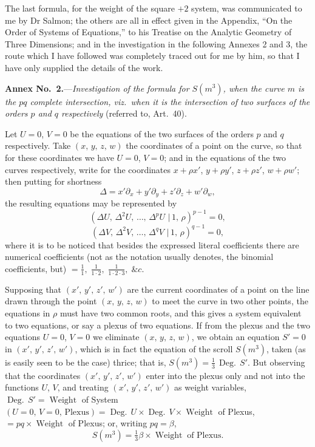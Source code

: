 \documentclass[11pt,a4paper]{article}
\providecommand{\mid}{\,|\,}
\providecommand{\Weight}{\operatorname{Weight}}
\providecommand{\Deg}{\operatorname{Deg.}}
\begin{document}
The last formula, for the weight of the square $+2$ system, was communicated to me by Dr Salmon; the others are all in effect given in the Appendix, ``On the Order of Systems of Equations,'' to his Treatise on the Analytic Geometry of Three Dimensions; and in the investigation in the following Annexes 2 and 3, the route which I have followed was completely traced out for me by him, so that I have only supplied the details of the work.

\bigskip

\begin{center}
\textbf{Annex No.~2.}---\textit{Investigation of the formula for $S(m^3)$, when the curve $m$ is the $pq$ complete intersection, viz.\ when it is the intersection of two surfaces of the orders $p$ and $q$ respectively} (referred to, Art.~40).
\end{center}

Let $U = 0$, $V = 0$ be the equations of the two surfaces of the orders $p$ and $q$ respectively. Take $(x,\,y,\,z,\,w)$ the coordinates of a point on the curve, so that for these coordinates we have $U = 0$, $V = 0$; and in the equations of the two curves respectively, write for the coordinates $x + \rho x'$, $y + \rho y'$, $z + \rho z'$, $w + \rho w'$; then putting for shortness
\[
\Delta = x' \partial_x + y' \partial_y + z' \partial_z + w' \partial_w,
\]
the resulting equations may be represented by
\[
(\Delta U,\,\Delta^2 U,\,\ldots,\,\Delta^p U\,\mid 1,\,\rho)^{p-1} = 0,
\]
\[
(\Delta V,\,\Delta^2 V,\,\ldots,\,\Delta^q V\,\mid 1,\,\rho)^{q-1} = 0,
\]
where it is to be noticed that besides the expressed literal coefficients there are numerical coefficients (not as the notation usually denotes, the binomial coefficients, but) $= \tfrac{1}{1},\;\tfrac{1}{1 \cdot 2},\;\tfrac{1}{1 \cdot 2 \cdot 3},\;\&c.$

\medskip

Supposing that $(x',\,y',\,z',\,w')$ are the current coordinates of a point on the line drawn through the point $(x,\,y,\,z,\,w)$ to meet the curve in two other points, the equations in $\rho$ must have two common roots, and this gives a system equivalent to two equations, or say a plexus of two equations. If from the plexus and the two equations $U = 0$, $V = 0$ we eliminate $(x,\,y,\,z,\,w)$, we obtain an equation $S' = 0$ in $(x',\,y',\,z',\,w')$, which is in fact the equation of the scroll $S(m^3)$, taken (as is easily seen to be the case) thrice; that is, $S(m^3) = \tfrac{1}{3}\,\Deg\,S'$. But observing that the coordinates $(x',\,y',\,z',\,w')$ enter into the plexus only and not into the functions $U$, $V$, and treating $(x',\,y',\,z',\,w')$ as weight variables, $\Deg\,S' = \Weight$ of System $(U=0,\,V=0,\,\text{Plexus}) = \Deg\,U \times \Deg\,V \times \Weight$ of Plexus, $= pq \times \Weight$ of Plexus; or, writing $pq = \beta$,
\[
S(m^3) = \tfrac{1}{3}\beta \times \Weight\;\text{of Plexus}.
\]
\end{document}

